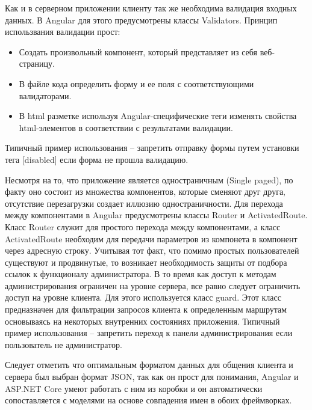 Как и в серверном приложении клиенту так же необходима валидация входных данных. В Angular для этого предусмотрены классы Validators. Принцип использвания валидации прост: 
\begin{itemize}
	\item Создать произвольный компонент, который представляет из себя веб-страницу.
	\item В файле кода определить форму и ее поля с соответствующими валидаторами.
	\item В html разметке используя Angular-специфические теги изменять свойства html-элементов в соответствии с результатами валидации.
\end{itemize} 
Типичный пример использования -- запретить отправку формы путем установки тега [disabled] если форма не прошла валидацию.

Несмотря на то, что приложение является одностраничным (Single paged), по факту оно состоит из множества компонентов, которые сменяют друг друга, отсутствие перезагрузки создает иллюзию одностраничности.
Для перехода между компонентами в Angular предусмотрены классы Router и ActivatedRoute. Класс Router служит для простого перехода между компонентами, а класс ActivatedRoute необходим для передачи параметров 
из компонета в компонент через адресную строку. Учитывая тот факт, что помимо простых пользователей существуют и продвинутые, то возникает необходимость защиты от подбора ссылок к функционалу администратора.
В то время как доступ к методам администрирования ограничен на уровне сервера, все равно следует ограничить доступ на уровне клиента. Для этого используется класс guard.
Этот класс предназначен для фильтрации запросов клиента к определенным маршрутам основываясь на некоторых внутренних состояниях приложения. Типичный пример использования -- запретить переход к панели администрирования
если пользователь не администратор.

Следует отметить что оптимальным форматом данных для общения клиента и сервера был выбран формат JSON, так как он прост для понимания, Angular и ASP.NET Core умеют работать с ним из коробки 
и он автоматически сопоставляется с моделями на основе совпадения имен в обоих фреймворках.






